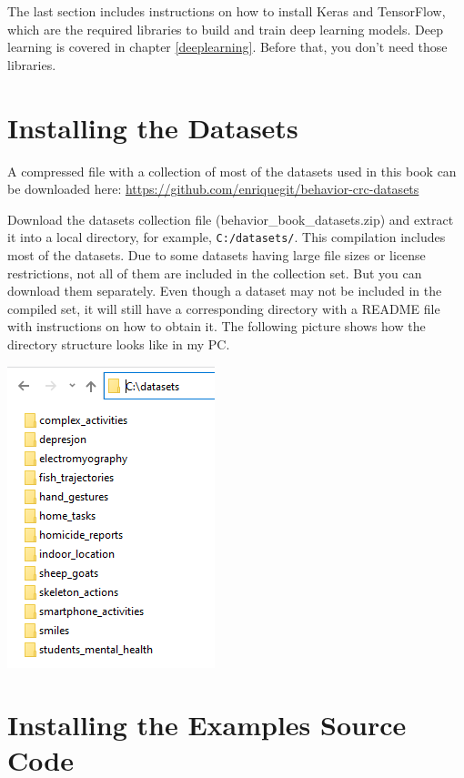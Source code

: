 \documentclass[
  11pt,
]{krantz}
\begin{document}
The last section includes instructions on how to install Keras and TensorFlow, which are the required libraries to build and train deep learning models. Deep learning is covered in chapter \ref{deeplearning}. Before that, you don't need those libraries.

\hypertarget{installing-the-datasets}{%
\section{Installing the Datasets}\label{installing-the-datasets}}

A compressed file with a collection of most of the datasets used in this book can be downloaded here: \url{https://github.com/enriquegit/behavior-crc-datasets}

Download the datasets collection file (behavior\_book\_datasets.zip) and extract it into a local directory, for example, \texttt{C:/datasets/}. This compilation includes most of the datasets. Due to some datasets having large file sizes or license restrictions, not all of them are included in the collection set. But you can download them separately. Even though a dataset may not be included in the compiled set, it will still have a corresponding directory with a README file with instructions on how to obtain it. The following picture shows how the directory structure looks like in my PC.

\begin{center}\includegraphics[width=0.35\linewidth]{images/datasets_dirs} \end{center}

\hypertarget{installing-the-examples-source-code}{%
\section{Installing the Examples Source Code}\label{installing-the-examples-source-code}}
\end{document}
